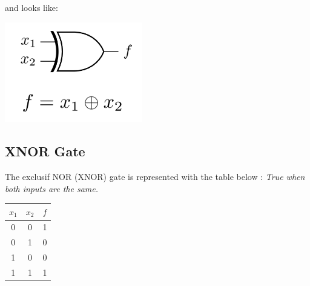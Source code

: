 \documentclass[12pt,openany, tikz,border=10pt]{book}
\begin{document}
			      	and looks like:
			      	\vspace*{-10px}
			      	\begin{center}
			      		\begin{minipage}[c]{0.45\textwidth} %
			      			\centering
			      			\includegraphics[width=0.45\textwidth]{circuits/6.11.1.png} %
			      		\end{minipage}
			      	\end{center}
			      	
			      	\subsection{XNOR Gate}
			      	The exclusif NOR (XNOR) gate is represented with the table below :
			      	\textit{True when both inputs are the same.}
			      	\vspace*{-10px}
			      	\begin{table}[h]
			      		\centering
			      		\begin{tabular}{|c|c|c|}
			      			\hline
			      			\( x_1 \) & \( x_2 \) & \( f \) \\
			      			\hline
			      			    
			      			0         & 0         & 1       \\
			      			0         & 1         & 0       \\
			      			1         & 0         & 0       \\
			      			1         & 1         & 1       \\
			      			\hline
			      		\end{tabular}
			      	\end{table}
			      	
\end{document}
